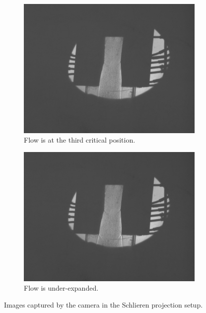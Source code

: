 \begin{figure}[htpb]
\begin{subfigure}{0.47\textwidth}
        \label{fig:schlieren_over-expanded}
    \end{subfigure} \\
    \begin{subfigure}{0.47\textwidth}
        \centering
        \includegraphics[width=\textwidth]{Figures/2-3rd_critical_condition.png}
        \caption{Flow is at the third critical position.}
        \label{fig:schlieren_third_critical}
    \end{subfigure}
    \begin{subfigure}{0.47\textwidth}
        \centering
        \includegraphics[width=\textwidth]{Figures/1-under-expanded_flow.png}
        \caption{Flow is under-expanded.}
        \label{fig:schlieren_under-expanded}
    \end{subfigure}
    \caption{Images captured by the camera in the Schlieren projection setup.}
    \label{fig:schlieren_image_captures}
\end{figure}